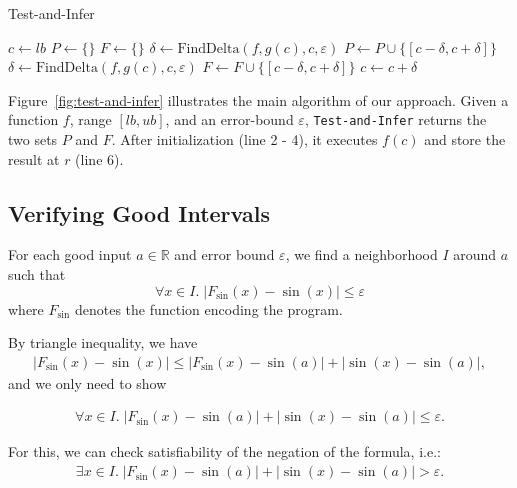 \begin{algorithm}
  \centering
  \caption{Test-and-Infer}
  \label{fig:test-and-infer}
  \begin{algorithmic}[1]
        \State $c \gets lb$
        \State $P \gets \{\}$
        \State $F \gets \{\}$
                \State $\delta \gets \mathrm{FindDelta}(f, g(c), c, \varepsilon)$
                \State $P \gets P \cup
                                \{ [c - \delta, c + \delta] \}$
            \Else
                \State $\delta \gets \mathrm{FindDelta}(f, g(c), c, \varepsilon)$
                \State $F \gets F \cup
                                \{ [c - \delta, c + \delta] \}$
            \EndIf
            \State $c \gets c + \delta$
        \EndWhile
    \EndProcedure
  \end{algorithmic}
\end{algorithm}

Figure~\ref{fig:test-and-infer} illustrates the main algorithm of our
approach. Given a function $f$, range $[lb, ub]$, and an error-bound
$\varepsilon$, \texttt{Test-and-Infer} returns the two sets $P$ and
$F$. After initialization (line 2 - 4), it executes $f(c)$ and store
the result at $r$ (line 6).


\subsection{Verifying Good Intervals}
For each good input $a\in \mathbb{R}$ and error bound $\varepsilon$,
we find a neighborhood $I$ around $a$ such that
$$\forall x\in I.\; |F_{\sin}(x)-\sin(x)|\leq \varepsilon$$
where $F_{\sin}$ denotes the function encoding the program.

By triangle inequality, we have
\begin{eqnarray}
|F_{\sin}(x) - \sin(x)| \leq |F_{\sin}(x) - \sin(a)| + |\sin(x) - \sin(a)|,
\end{eqnarray}
and we only need to show

\begin{eqnarray}
\forall x\in I.\; |F_{\sin}(x) - \sin(a)| + |\sin(x) - \sin(a)| \leq \varepsilon.
\end{eqnarray}

For this, we can check satisfiability of the negation of the formula, i.e.:
\begin{eqnarray}
\exists x\in I.\; |F_{\sin}(x) - \sin(a)| + |\sin(x) - \sin(a)| > \varepsilon.
\end{eqnarray}

